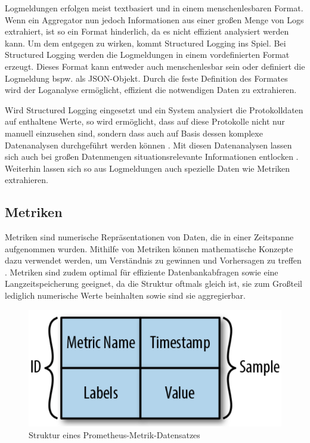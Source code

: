 
Logmeldungen erfolgen meist textbasiert und in einem menschenlesbaren Format. Wenn ein Aggregator nun jedoch Informationen aus einer großen Menge von Logs extrahiert, ist so ein Format hinderlich, da es nicht effizient analysiert werden kann. Um dem entgegen zu wirken, kommt Structured Logging ins Spiel. Bei Structured Logging \cite{StructuredAndInteroperableLogging} werden die Logmeldungen in einem vordefinierten Format erzeugt. Dieses Format kann entweder auch menschenlesbar sein oder definiert die Logmeldung bspw. als JSON-Objekt. Durch die feste Definition des Formates wird der Loganalyse ermöglicht, effizient die notwendigen Daten zu extrahieren.

Wird Structured Logging eingesetzt und ein System analysiert die Protokolldaten auf enthaltene Werte, so wird ermöglicht, dass auf diese Protokolle nicht nur manuell einzusehen sind, sondern dass auch auf Basis dessen komplexe Datenanalysen durchgeführt werden können \cite{StructuredAndInteroperableLogging}. Mit diesen Datenanalysen lassen sich auch bei großen Datenmengen situationsrelevante Informationen entlocken \cite{StructuredLoggingCraftingUsefulMessageContent}. Weiterhin lassen sich so aus Logmeldungen auch spezielle Daten wie Metriken extrahieren.

\subsection{Metriken}

Metriken sind numerische Repräsentationen von Daten, die in einer Zeitspanne aufgenommen wurden. Mithilfe von Metriken können mathematische Konzepte dazu verwendet werden, um Verständnis zu gewinnen und Vorhersagen zu treffen \cite{DistributedSystemsObservability}. Metriken sind zudem optimal für effiziente Datenbankabfragen sowie eine Langzeitspeicherung geeignet, da die Struktur oftmals gleich ist, sie zum Großteil lediglich numerische Werte beinhalten sowie sind sie aggregierbar.

\begin{figure}
\centering
\includegraphics[width=\linewidth]{img/03_methoden/prometheus-metric-sample.png}
\caption{Struktur eines Prometheus-Metrik-Datensatzes \cite{DistributedSystemsObservability}}
\label{fig:prometheus-metric-datensatz}
\end{figure}

